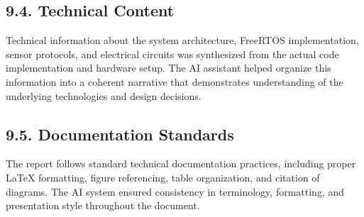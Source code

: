 \documentclass[12pt]{article}
\begin{document}
\subsection*{9.4. Technical Content}

Technical information about the system architecture, FreeRTOS implementation, sensor protocols, and electrical circuits was synthesized from the actual code implementation and hardware setup. The AI assistant helped organize this information into a coherent narrative that demonstrates understanding of the underlying technologies and design decisions.

\subsection*{9.5. Documentation Standards}

The report follows standard technical documentation practices, including proper LaTeX formatting, figure referencing, table organization, and citation of diagrams. The AI system ensured consistency in terminology, formatting, and presentation style throughout the document.
\end{document}
